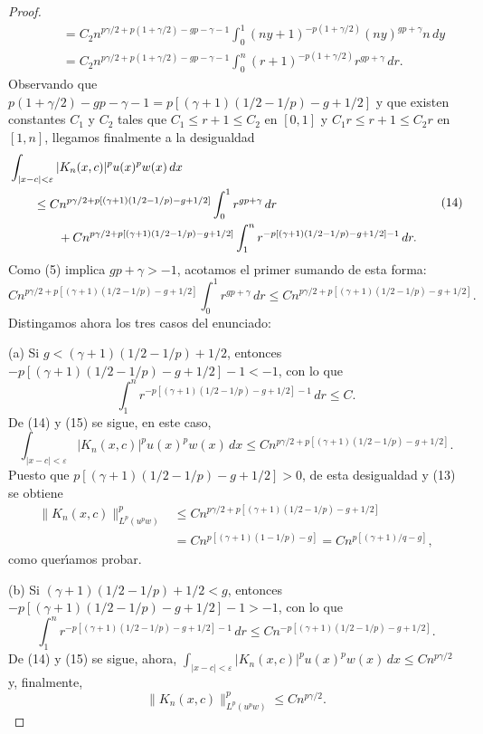 \documentclass[a4paper,12pt]{article}
\theoremstyle{plain}
\theoremstyle{definition}
\begin{document}
\begin{proof}
\begin{align*}
&\qquad= C_{2} n^{p\gamma/2+p(1+\gamma/2)-gp-\gamma-1}
\int_{0}^{1} (ny + 1)^{-p(1+\gamma/2)} (ny)^{gp+\gamma} n\,dy \\
&\qquad= C_{2} n^{p\gamma/2+p(1+\gamma/2)-gp-\gamma-1}
\int_{0}^{n} (r + 1)^{-p(1+\gamma/2)} r^{gp+\gamma} \,dr.
\end{align*}
Observando que
$p (1+\gamma/2) - gp - \gamma - 1 = p [ (\gamma+1) (1/2 - 1/p) - g + 1/2]$
y que existen constantes $C_{1}$ y $C_{2}$ tales que
$C_{1} \leq r+1 \leq C_{2}$ en $[0,1]$ y $C_{1}r \leq r+1 \leq C_{2}r$
en $[1,n]$, llegamos finalmente a la desigualdad
\begin{equation}
\begin{aligned}
&\int_{| x - c | < \varepsilon} | K_{n}(x,c) |^{p} u(x)^{p} w(x)\,dx \\
&\qquad\leq C n^{p \gamma/2+p [ (\gamma+1)(1/2 - 1/p) - g+1/2 ]}
\int_{0}^{1} r^{gp+\gamma} \,dr \\
&\qquad\qquad\null+ C n^{p\gamma/2+p [ (\gamma+1)(1/2 - 1/p) - g+1/2 ]}
\int_{1}^{n} r^{-p [ (\gamma+1)(1/2 - 1/p) - g+1/2 ] -1} \,dr.
\end{aligned}
\tag{14}
\end{equation}
Como (5) implica $gp + \gamma > -1$,
acotamos el primer sumando de esta forma:
\begin{equation}
C n^{p\gamma/2+p [ (\gamma+1)(1/2 - 1/p) - g+1/2 ]}
\int_{0}^{1} r^{gp+\gamma} \,dr
\leq C n^{p \gamma/2+p [ (\gamma+1)(1/2 - 1/p) - g+1/2 ]}.
\tag{15}
\end{equation}
Distingamos ahora los tres casos del enunciado:

    (a) Si $g < (\gamma +1) (1/2 - 1/p) + 1/2$,
entonces $-p [ (\gamma +1) (1/2 - 1/p) -g+ 1/2 ] -1 < -1$, con lo que
$$
\int_{1}^{n} r^{-p [ (\gamma+1)(1/2 - 1/p) - g+1/2 ] -1} \,dr \leq C.
$$
De (14) y (15) se sigue, en este caso,
$$
\int_{| x - c | < \varepsilon} | K_{n}(x,c) |^{p} u(x)^{p} w(x)\,dx
\leq C n^{p\gamma/2+p [ (\gamma+1)(1/2 - 1/p) - g+1/2 ]}.
$$
Puesto que $p [ (\gamma +1)(1/2 - 1/p) - g+1/2 ] > 0$,
de esta desigualdad y (13) se obtiene
\begin{align*}
\| K_{n}(x,c) \|^{p}_{L^{p}(u^{p}w)}
&\leq C n^{p\gamma/2+p [ (\gamma+1)(1/2 - 1/p) - g+1/2 ]} \\
&= C n^{p [ (\gamma+1)(1 - 1/p) - g ]}
= C n^{p [ (\gamma+1)/q - g ]},
\end{align*}
como quer\'{\i}amos probar.

    (b) Si $(\gamma +1) (1/2 - 1/p) + 1/2 < g$,
entonces $-p [ (\gamma +1) (1/2 - 1/p) -g+ 1/2 ] -1 > -1$, con lo que
$$
\int_{1}^{n} r^{-p [ (\gamma+1)(1/2 - 1/p) - g+1/2 ] -1} \,dr
\leq C n^{-p [ (\gamma+1)(1/2 - 1/p) - g+1/2 ] }.
$$
De (14) y (15) se sigue, ahora,
$\int_{| x - c | < \varepsilon} | K_{n}(x,c) |^{p} u(x)^{p} w(x)\,dx
\leq C n^{p\gamma/2}$
y, finalmente,
$$
\| K_{n}(x,c) \|^{p}_{L^{p}(u^{p}w)} \leq C n^{p\gamma/2}.
$$


\end{proof}
\end{document}
